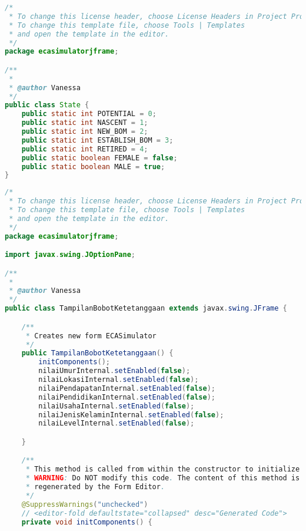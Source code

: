 \begin{lstlisting}[language=Java, caption=State.java]
/*
 * To change this license header, choose License Headers in Project Properties.
 * To change this template file, choose Tools | Templates
 * and open the template in the editor.
 */
package ecasimulatorjframe;

/**
 *
 * @author Vanessa
 */
public class State {
    public static int POTENTIAL = 0;
    public static int NASCENT = 1;
    public static int NEW_BOM = 2;
    public static int ESTABLISH_BOM = 3;
    public static int RETIRED = 4;
    public static boolean FEMALE = false;
    public static boolean MALE = true;
}


\end{lstlisting}

\begin{lstlisting}[language=Java, caption=TampilanBobotKetetanggaan.java]
/*
 * To change this license header, choose License Headers in Project Properties.
 * To change this template file, choose Tools | Templates
 * and open the template in the editor.
 */
package ecasimulatorjframe;

import javax.swing.JOptionPane;

/**
 *
 * @author Vanessa
 */
public class TampilanBobotKetetanggaan extends javax.swing.JFrame {

    /**
     * Creates new form ECASimulator
     */
    public TampilanBobotKetetanggaan() {
        initComponents();
        nilaiUmurInternal.setEnabled(false);
        nilaiLokasiInternal.setEnabled(false);
        nilaiPendapatanInternal.setEnabled(false);
        nilaiPendidikanInternal.setEnabled(false);
        nilaiUsahaInternal.setEnabled(false);
        nilaiJenisKelaminInternal.setEnabled(false);
        nilaiLevelInternal.setEnabled(false);

    }

    /**
     * This method is called from within the constructor to initialize the form.
     * WARNING: Do NOT modify this code. The content of this method is always
     * regenerated by the Form Editor.
     */
    @SuppressWarnings("unchecked")
    // <editor-fold defaultstate="collapsed" desc="Generated Code">                          
    private void initComponents() {


\end{lstlisting}
